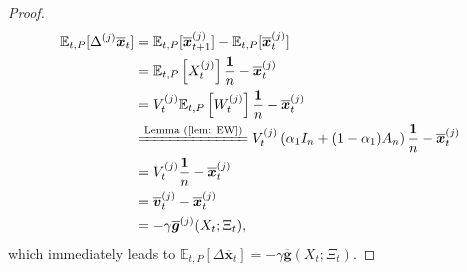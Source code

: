 \begin{lemma}
\begin{proof}
\begin{align*}
\mathbb{E}_{t,P}[\Delta^{(j)}\overline{\bm{x}}_t] &= \mathbb{E}_{t,P}[\overline{\bm{x}}_{t+1}^{(j)}] - \mathbb{E}_{t,P}[\overline{\bm{x}}_t^{(j)}]\\
&=\mathbb{E}_{t,P}\left[X_t^{(j)}\right]\frac{\mathbf{1}}{n} - \overline{\bm{x}}_t^{(j)}\\
&=V_t^{(j)}\mathbb{E}_{t,P}\left[W_t^{(j)}\right]\frac{\bm{1}}{n} - \overline{\bm{x}}_t^{(j)}\\
&\xlongequal{\text{Lemma (\ref{lem: EW})}} V_t^{(j)}\left(\alpha_1I_n +(1-\alpha_1)A_n\right)\frac{\bm{1}}{n} - \overline{\bm{x}}_t^{(j)}\\
&=  V_t^{(j)}\frac{\bm{1}}{n} - \overline{\bm{x}}_t^{(j)}\\
&= \overline{\bm{v}}_t^{(j)} - \overline{\bm{x}}_t^{(j)}\\
&=  -\gamma \overline{\bm{g}}^{(j)}(X_t;\Xi_t),
\end{align*}
which immediately leads to $\mathbb{E}_{t,P}\left[\Delta\overline{\bm{x}}_t\right] = -\gamma \overline{\bm{g}}(X_t; \Xi_t)$.
\end{proof}

\end{lemma}


